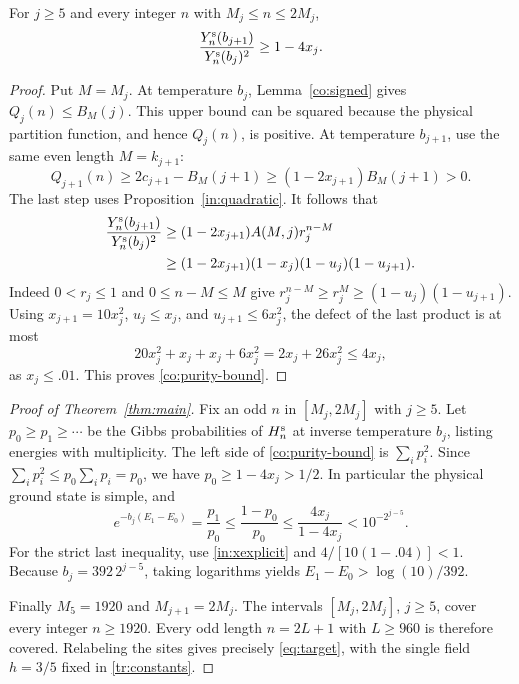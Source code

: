 \begin{proposition}\label{co:purity}
For $j\ge5$ and every integer $n$ with $M_j\le n\le2M_j$,
\begin{equation}\label{co:purity-bound}
 \frac{Y_n^{\rm s}(b_{j+1})}{Y_n^{\rm s}(b_j)^2}\ge1-4x_j.
\end{equation}
\end{proposition}
\begin{proof}
Put $M=M_j$. At temperature $b_j$, Lemma~\ref{co:signed} gives
$Q_j(n)\le B_M(j)$. This upper bound can be squared because the
physical partition function, and hence $Q_j(n)$, is positive.
At temperature $b_{j+1}$, use the same even length $M=k_{j+1}$:
\[
 Q_{j+1}(n)\ge2c_{j+1}-B_M(j+1)
 \ge(1-2x_{j+1})B_M(j+1)>0.
\]
The last step uses Proposition~\ref{in:quadratic}. It follows that
\begin{align}
 \frac{Y_n^{\rm s}(b_{j+1})}{Y_n^{\rm s}(b_j)^2}
 &\ge(1-2x_{j+1})A(M,j)r_j^{n-M} \notag\\
 &\ge(1-2x_{j+1})(1-x_j)(1-u_j)(1-u_{j+1}).
                                                    \label{co:product}
\end{align}
Indeed $0<r_j\le1$ and $0\le n-M\le M$ give
$r_j^{n-M}\ge r_j^M\ge(1-u_j)(1-u_{j+1})$.
Using $x_{j+1}=10x_j^2$, $u_j\le x_j$, and
$u_{j+1}\le6x_j^2$, the defect of the last product is at most
\[
 20x_j^2+x_j+x_j+6x_j^2
 =2x_j+26x_j^2\le4x_j,
\]
as $x_j\le.01$. This proves \eqref{co:purity-bound}.
\end{proof}

\begin{proof}[Proof of Theorem~\ref{thm:main}]
Fix an odd $n$ in $[M_j,2M_j]$ with $j\ge5$.
Let $p_0\ge p_1\ge\cdots$ be the Gibbs probabilities of $H_n^{\rm s}$
at inverse temperature $b_j$, listing energies with multiplicity.
The left side of \eqref{co:purity-bound} is $\sum_i p_i^2$.
Since $\sum_i p_i^2\le p_0\sum_i p_i=p_0$, we have
$p_0\ge1-4x_j>1/2$. In particular the physical ground state is
simple, and
\begin{equation}\label{co:ratio}
 e^{-b_j(E_1-E_0)}=\frac{p_1}{p_0}
 \le\frac{1-p_0}{p_0}
 \le\frac{4x_j}{1-4x_j}
 <10^{-2^{j-5}}.
\end{equation}
For the strict last inequality, use \eqref{in:xexplicit} and
$4/[10(1-.04)]<1$. Because $b_j=392\,2^{j-5}$,
taking logarithms yields $E_1-E_0>\log(10)/392$.

Finally $M_5=1920$ and $M_{j+1}=2M_j$. The intervals
$[M_j,2M_j]$, $j\ge5$, cover every integer $n\ge1920$.
Every odd length $n=2L+1$ with $L\ge960$ is therefore covered.
Relabeling the sites gives precisely \eqref{eq:target}, with the
single field $h=3/5$ fixed in \eqref{tr:constants}.
\end{proof}
